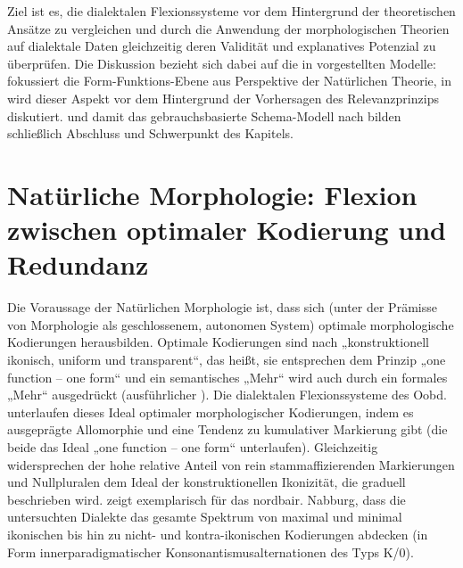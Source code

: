 \begin{sloppypar}
Ziel ist es, die dialektalen Flexionssysteme vor dem Hintergrund der theoretischen Ansätze zu vergleichen und durch die Anwendung der morphologischen Theorien auf dialektale Daten gleichzeitig deren Validität und explanatives Potenzial zu überprüfen. Die Diskussion bezieht sich dabei auf die in  vorgestellten Modelle:  fokussiert die Form-Funktions-Ebene aus Perspektive der Natürlichen Theorie, in  wird dieser Aspekt vor dem Hintergrund der Vorhersagen des Relevanzprinzips diskutiert.  und damit das gebrauchsbasierte Schema-Modell nach \citet{Köpcke1993} bilden schließlich Abschluss und Schwerpunkt des Kapitels.
\end{sloppypar}

\section[head=Natürliche Morphologie]{Natürliche Morphologie: Flexion zwischen optimaler Kodierung und Redundanz}
\label{sec:10.1}
Die Voraussage der Natürlichen Morphologie ist, dass sich (unter der Prämisse von Morphologie als geschlossenem, autonomen System) optimale morphologische Kodierungen herausbilden. Optimale Kodierungen sind nach \citet[22]{Mayerthaler1981} „konstruktionell ikonisch, uniform und transparent“, das heißt, sie entsprechen dem Prinzip „one function -- one form“ und ein semantisches „Mehr“ wird auch durch ein formales „Mehr“ ausgedrückt (ausführlicher ). Die dialektalen Flexionssysteme des Oobd. unterlaufen dieses Ideal optimaler morphologischer Kodierungen, indem es ausgeprägte Allomorphie und eine Tendenz zu kumulativer Markierung gibt (die beide das Ideal „one function -- one form“ unterlaufen). Gleichzeitig widersprechen der hohe relative Anteil von rein stammaffizierenden Markierungen und Nullpluralen dem Ideal der konstruktionellen Ikonizität, die graduell beschrieben wird.   zeigt exemplarisch für das nordbair. Nabburg, dass die untersuchten Dialekte das gesamte Spektrum von maximal und minimal ikonischen bis hin zu nicht- und kontra-ikonischen Kodierungen abdecken (in Form innerparadigmatischer Konsonantismusalternationen des Typs K/0).


